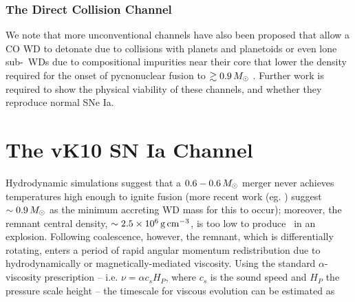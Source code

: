{\subsubsection{The Direct Collision Channel}

We note that more unconventional channels have also been proposed that allow a CO WD to detonate due to collisions with planets and planetoids \citep{distfg15} or even lone sub-\Mch\ WDs due to compositional impurities near their core that lower the density required for the onset of pycnonuclear fusion to $\gtrsim0.9\,\Msun$ \citep{chio+15}.  Further work is required to show the physical viability of these channels, and whether they reproduce normal SNe Ia.

\section{The vK10 SN Ia Channel}



Hydrodynamic simulations \citep{loreig09} suggest that a $0.6-0.6\,\Msun$ merger never achieves temperatures high enough to ignite fusion (more recent work (eg. \citep{pakm+11, dan+12}) suggest $\sim0.9\,\Msun$ as the minimum accreting WD mass for this to occur); moreover, the remnant central density, $\sim2.5\times10^6\,\gcc$, is too low to produce \Ni\ in an explosion.  Following coalescence, however, the remnant, which is differentially rotating, enters a period of rapid angular momentum redistribution due to hydrodynamically or magnetically-mediated viscosity.  Using the standard $\alpha$-viscosity prescription \cite{shaks73} -- i.e. $\nu = \alpha c_s H_P$, where $c_s$ is the sound speed and $H_P$ the pressure scale height -- the timescale for viscous evolution can be estimated as

}
